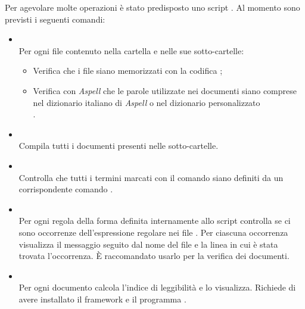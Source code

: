 Per agevolare molte operazioni è stato predisposto uno script . Al momento sono previsti i seguenti comandi:
\begin{itemize}

\item \textbf{} \\
Per ogni file  contenuto nella cartella e nelle sue sotto-cartelle:
\begin{itemize}
	\item Verifica che i file siano memorizzati con la codifica ;
	\item Verifica con \emph{Aspell} che le parole utilizzate nei documenti siano comprese nel dizionario italiano di \emph{Aspell} o nel dizionario personalizzato \\
	.
\end{itemize}
	
\item \textbf{} \\
Compila tutti i documenti presenti nelle sotto-cartelle.

\item \textbf{} \\
Controlla che tutti i termini marcati con il comando \code{\\glossario\{\dots\}} siano definiti da un corrispondente comando .

\item \textbf{} \\
Per ogni regola della forma  definita internamente allo script controlla se ci sono occorrenze dell'espressione regolare  nei file . Per ciascuna occorrenza visualizza il messaggio  seguito dal nome del file e la linea in cui è stata trovata l'occorrenza. È raccomandato usarlo per la verifica dei documenti.

\item \textbf{} \\
Per ogni documento  calcola l'indice di leggibilità  e lo visualizza. Richiede di avere installato il framework  e il programma .

\end{itemize}

